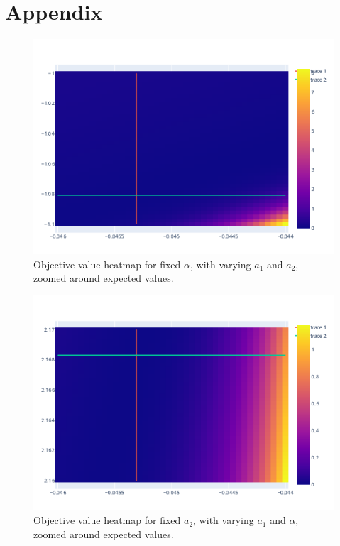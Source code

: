 
\chapter{Appendix}
\label{Parameter Space Heatmaps}

\begin{figure}[h!]
    \centering
    \includegraphics[scale=0.7]{imgs/c4/heat-1-zoomed-current-only.png}
    \caption{Objective value heatmap for fixed $\alpha$, with varying 
    $a_1$ and $a_2$, zoomed around expected values.}
    \label{heat-1-zoomed}
\end{figure}

\begin{figure}[h!]
    \centering
    \includegraphics[scale=0.7]{imgs/c4/heat-2-zoomed-current-only.png}
    \caption{Objective value heatmap for fixed $a_2$, with varying 
    $a_1$ and $\alpha$, zoomed around expected values.}
    \label{heat-2-zoomed}
\end{figure}

